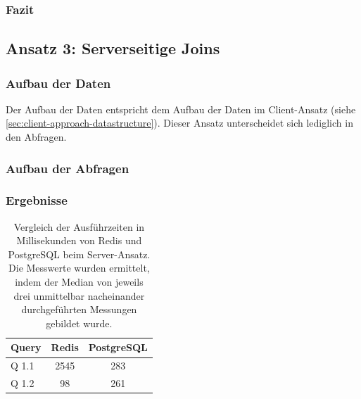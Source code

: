 
\subsubsection{Fazit}

\subsection{Ansatz 3: Serverseitige Joins}
\subsubsection{Aufbau der Daten}
Der Aufbau der Daten entspricht dem Aufbau der Daten im Client-Ansatz (siehe \cref{sec:client-approach-datastructure}). Dieser Ansatz unterscheidet sich lediglich in den Abfragen.
\subsubsection{Aufbau der Abfragen}
\subsubsection{Ergebnisse}

\begin{table}[h]
\centering
\begin{tabular}{lcc}
\hline
Query & Redis & PostgreSQL \\ \hline
Q 1.1 & 2545  & 283       \\
Q 1.2 & 98    & 261       \\ \hline
\end{tabular}
\caption{Vergleich der Ausführzeiten in Millisekunden von Redis und PostgreSQL beim Server-Ansatz.\\
 Die Messwerte wurden ermittelt, indem der Median von jeweils drei unmittelbar nacheinander durchgeführten Messungen gebildet wurde.}
\label{tab:results-server}
\end{table}

